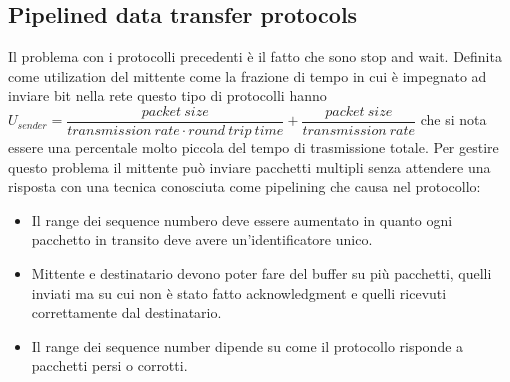 \subsection{Pipelined data transfer protocols}
Il problema con i protocolli precedenti \`e il fatto che sono stop and wait. Definita come utilization del mittente come la frazione di tempo in cui \`e 
impegnato ad inviare bit nella rete questo tipo di protocolli hanno $U_{sender}=\dfrac{packet\ size}{transmission\ rate\cdot round\ trip\ time}+
\dfrac{packet\ size}{transmission\ rate}$ che si nota essere una percentale molto piccola del tempo di trasmissione totale. Per gestire questo problema
il mittente pu\`o inviare pacchetti multipli senza attendere una risposta con una tecnica conosciuta come pipelining che causa nel protocollo:
\begin{itemize}
\item Il range dei sequence numbero deve essere aumentato in quanto ogni pacchetto in transito deve avere un'identificatore unico. 
\item Mittente e destinatario devono poter fare del buffer su pi\`u pacchetti, quelli inviati ma su cui non \`e stato fatto acknowledgment e quelli ricevuti
correttamente dal destinatario.
\item Il range dei sequence number dipende su come il protocollo risponde a pacchetti persi o corrotti. 
\end{itemize}
